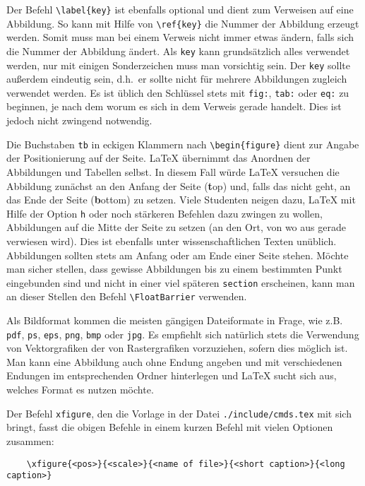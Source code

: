 Der Befehl \verb|\label{key}| ist ebenfalls optional und dient zum Verweisen auf eine Abbildung. So kann mit Hilfe von \verb|\ref{key}| die Nummer der Abbildung erzeugt werden. Somit muss man bei einem Verweis nicht immer etwas ändern, falls sich die Nummer der Abbildung ändert. Als \verb|key| kann grundsätzlich alles verwendet werden, nur mit einigen Sonderzeichen muss man vorsichtig sein. Der \verb|key| sollte außerdem eindeutig sein, d.h.~er sollte nicht für mehrere Abbildungen zugleich verwendet werden. Es ist üblich den Schlüssel stets mit \verb|fig:|, \verb|tab:| oder \verb|eq:| zu beginnen, je nach dem worum es sich in dem Verweis gerade handelt. Dies ist jedoch nicht zwingend notwendig.

Die Buchstaben \verb|tb| in eckigen Klammern nach \verb|\begin{figure}| dient zur Angabe der Positionierung auf der Seite. LaTeX übernimmt das Anordnen der Abbildungen und Tabellen selbst. In diesem Fall würde LaTeX versuchen die Abbildung zunächst an den Anfang der Seite (\textbf{t}op) und, falls das nicht geht, an das Ende der Seite (\textbf{b}ottom) zu setzen. Viele Studenten neigen dazu, LaTeX mit Hilfe der Option \verb|h| oder noch stärkeren Befehlen dazu zwingen zu wollen, Abbildungen auf die Mitte der Seite zu setzen (an den Ort, von wo aus gerade verwiesen wird). Dies ist ebenfalls unter wissenschaftlichen Texten unüblich. Abbildungen sollten stets am Anfang oder am Ende einer Seite stehen. Möchte man sicher stellen, dass gewisse Abbildungen bis zu einem bestimmten Punkt eingebunden sind und nicht in einer viel späteren \verb|section| erscheinen, kann man an dieser Stellen den Befehl \verb|\FloatBarrier| verwenden.

Als Bildformat kommen die meisten gängigen Dateiformate in Frage, wie z.B. \verb|pdf|, \verb|ps|, \verb|eps|, \verb|png|, \verb|bmp| oder \verb|jpg|. Es empfiehlt sich natürlich stets die Verwendung von Vektorgrafiken der von Rastergrafiken vorzuziehen, sofern dies möglich ist. Man kann eine Abbildung auch ohne Endung angeben und mit verschiedenen Endungen im entsprechenden Ordner hinterlegen und LaTeX sucht sich aus, welches Format es nutzen möchte.

Der Befehl \verb|xfigure|, den die Vorlage in der Datei \verb|./include/cmds.tex| mit sich bringt, fasst die obigen Befehle in einem kurzen Befehl mit vielen Optionen zusammen:

\begin{verbatim}
	\xfigure{<pos>}{<scale>}{<name of file>}{<short caption>}{<long caption>}
\end{verbatim}

